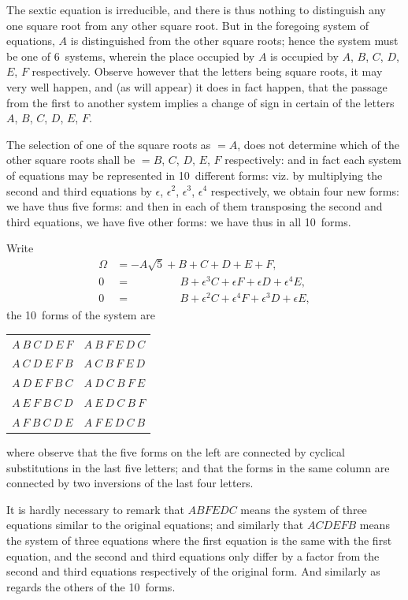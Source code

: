 \documentclass[11pt,a4paper]{article}
\theoremstyle{definition}
\begin{document}
The sextic equation is irreducible, and there is thus nothing to distinguish any one square root from any other square root. But in the foregoing system of equations, $A$ is distinguished from the other square roots; hence the system must be one of 6~systems, wherein the place occupied by $A$ is occupied by $A$, $B$, $C$, $D$, $E$, $F$ respectively. Observe however that the letters being square roots, it may very well happen, and (as will appear) it does in fact happen, that the passage from the first to another system implies a change of sign in certain of the letters $A$, $B$, $C$, $D$, $E$, $F$.

The selection of one of the square roots as $= A$, does not determine which of the other square roots shall be $= B$, $C$, $D$, $E$, $F$ respectively: and in fact each system of equations may be represented in 10~different forms: viz. by multiplying the second and third equations by $\epsilon$, $\epsilon^2$, $\epsilon^3$, $\epsilon^4$ respectively, we obtain four new forms: we have thus five forms: and then in each of them transposing the second and third equations, we have five other forms: we have thus in all 10~forms.

Write
\begin{align*}
\Omega &= -A\sqrt{5} + B + C + D + E + F, \\
0 &= \phantom{-A\sqrt{5} +}\, B + \epsilon^3 C + \epsilon F + \epsilon D + \epsilon^4 E, \\
0 &= \phantom{-A\sqrt{5} +}\, B + \epsilon^2 C + \epsilon^4 F + \epsilon^3 D + \epsilon E,
\end{align*}
the 10~forms of the system are
\begin{center}
\begin{tabular}{l|l}
$A\ B\ C\ D\ E\ F$ & $A\ B\ F\ E\ D\ C$ \\
$A\ C\ D\ E\ F\ B$ & $A\ C\ B\ F\ E\ D$ \\
$A\ D\ E\ F\ B\ C$ & $A\ D\ C\ B\ F\ E$ \\
$A\ E\ F\ B\ C\ D$ & $A\ E\ D\ C\ B\ F$ \\
$A\ F\ B\ C\ D\ E$ & $A\ F\ E\ D\ C\ B$
\end{tabular}
\end{center}
where observe that the five forms on the left are connected by cyclical substitutions in the last five letters; and that the forms in the same column are connected by two inversions of the last four letters.

It is hardly necessary to remark that $ABFEDC$ means the system of three equations similar to the original equations; and similarly that $ACDEFB$ means the system of three equations where the first equation is the same with the first equation, and the second and third equations only differ by a factor from the second and third equations respectively of the original form. And similarly as regards the others of the 10~forms.
\end{document}
